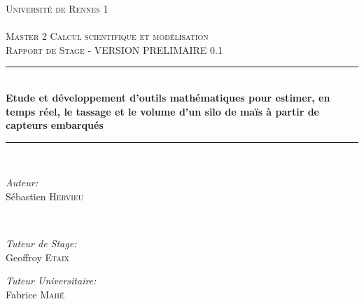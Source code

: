 \documentclass[12pt,a4paper]{report}
\begin{document}
\begin{titlepage}

\newcommand{\HRule}{\rule{\linewidth}{0.5mm}} %

\center %
 

\textsc{\LARGE Université de Rennes 1}\\[1cm] 
\textsc{\Large }\\[0.5cm] %
\textsc{\large Master 2 Calcul scientifique et modélisation}\\
\textsc{Rapport de Stage - VERSION PRELIMAIRE 0.1}\\

\HRule \\[0.4cm]
{ \huge \bfseries Etude et développement d’outils mathématiques pour estimer, en temps réel, le tassage et le volume d’un silo de maïs à partir de capteurs embarqués}\\[0.4cm] 
\HRule \\[1.5cm]
 

\begin{minipage}{0.4\textwidth}
\begin{flushleft} \large
\emph{Auteur:}\\
Sébastien \textsc{Hervieu}
\end{flushleft}
\end{minipage}
~
\begin{minipage}{0.4\textwidth}

\begin{flushright}
	\emph{Tuteur de Stage:} \\
	Geoffroy \textsc{Etaix}
\end{flushright}

\begin{flushright} \large
	\emph{Tuteur Universitaire:} \\
	Fabrice \textsc{Mahé} 
\end{flushright}


\end{minipage}
\end{titlepage}
\end{document}
